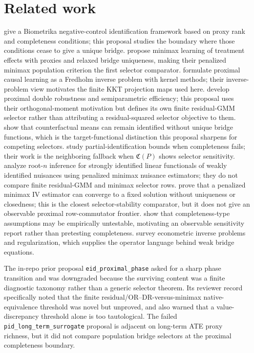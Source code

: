 \documentclass[11pt]{article}
\theoremstyle{definition}
\theoremstyle{plain}
\theoremstyle{remark}
\begin{document}
\section{Related work}
\citet{MiaoGengTchetgen2018} give a Biometrika negative-control identification framework based on proxy rank and completeness conditions; this proposal studies the boundary where those conditions cease to give a unique bridge. \citet[Sections 3--4]{KallusMaoUehara2021} propose minimax learning of treatment effects with proxies and relaxed bridge uniqueness, making their penalized minimax population criterion the first selector comparator. \citet{MastouriZhuGultchinEtAl2021} formulate proximal causal learning as a Fredholm inverse problem with kernel methods; their inverse-problem view motivates the finite KKT projection maps used here. \citet[Section 3, especially equation (9) and Theorem 3.2]{CuiPuShiMiaoTchetgen2024} develop proximal double robustness and semiparametric efficiency; this proposal uses their orthogonal-moment motivation but defines its own finite residual-GMM selector rather than attributing a residual-squared selector objective to them. \citet[abstract and Sections 2--3]{ZhangLiMiaoTchetgen2023} show that counterfactual means can remain identified without unique bridge functions, which is the target-functional distinction this proposal sharpens for competing selectors. \citet[abstract and Sections 3--4]{GhassamiShpitserTchetgen2023} study partial-identification bounds when completeness fails; their work is the neighboring fallback when \(\mathfrak C(P)\) shows selector sensitivity. \citet[abstract and Section 2]{BennettKallusMaoNeweySyrgkanisUehara2023COLT} analyze root-\(n\) inference for strongly identified linear functionals of weakly identified nuisances using penalized minimax nuisance estimators; they do not compare finite residual-GMM and minimax selector rows. \citet[abstract and Theorem 4]{BennettKallusMaoNeweySyrgkanisUehara2023MinimaxIV} prove that a penalized minimax IV estimator can converge to a fixed solution without uniqueness or closedness; this is the closest selector-stability comparator, but it does not give an observable proximal row-commutator frontier. \citet{CanaySantosShaikh2013} show that completeness-type assumptions may be empirically untestable, motivating an observable sensitivity report rather than pretesting completeness. \citet{CarrascoFlorensRenault2007} survey econometric inverse problems and regularization, which supplies the operator language behind weak bridge equations.

The in-repo prior proposal \texttt{eid\_proximal\_phase} asked for a sharp phase transition and was downgraded because the surviving content was a finite diagnostic taxonomy rather than a generic selector theorem. Its reviewer record specifically noted that the finite residual/OR--DR-versus-minimax native-equivalence threshold was novel but unproved, and also warned that a value-discrepancy threshold alone is too tautological. The failed \texttt{pid\_long\_term\_surrogate} proposal is adjacent on long-term ATE proxy richness, but it did not compare population bridge selectors at the proximal completeness boundary.
\end{document}
